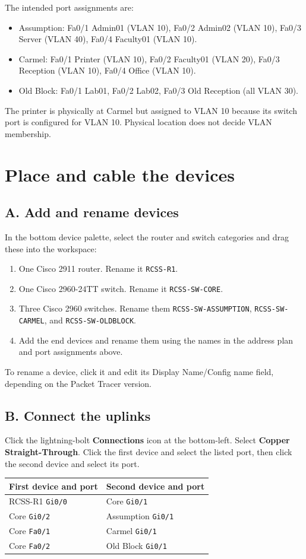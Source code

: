 \documentclass[11pt,a4paper]{article}
\begin{document}
The intended port assignments are:
\begin{itemize}
\item Assumption: Fa0/1 Admin01 (VLAN 10), Fa0/2 Admin02 (VLAN 10), Fa0/3 Server (VLAN 40), Fa0/4 Faculty01 (VLAN 10).
\item Carmel: Fa0/1 Printer (VLAN 10), Fa0/2 Faculty01 (VLAN 20), Fa0/3 Reception (VLAN 10), Fa0/4 Office (VLAN 10).
\item Old Block: Fa0/1 Lab01, Fa0/2 Lab02, Fa0/3 Old Reception (all VLAN 30).
\end{itemize}
The printer is physically at Carmel but assigned to VLAN 10 because its switch port is configured for VLAN 10. Physical location does not decide VLAN membership.

\section{Place and cable the devices}\label{sec:topology}
\subsection*{A. Add and rename devices}
In the bottom device palette, select the router and switch categories and drag these into the workspace:
\begin{enumerate}
\item One Cisco 2911 router. Rename it \texttt{RCSS-R1}.
\item One Cisco 2960-24TT switch. Rename it \texttt{RCSS-SW-CORE}.
\item Three Cisco 2960 switches. Rename them \texttt{RCSS-SW-ASSUMPTION}, \texttt{RCSS-SW-CARMEL}, and \texttt{RCSS-SW-OLDBLOCK}.
\item Add the end devices and rename them using the names in the address plan and port assignments above.
\end{enumerate}
To rename a device, click it and edit its Display Name/Config name field, depending on the Packet Tracer version.

\subsection*{B. Connect the uplinks}
Click the lightning-bolt \textbf{Connections} icon at the bottom-left. Select \textbf{Copper Straight-Through}. Click the first device and select the listed port, then click the second device and select its port.

\begin{center}
\begin{tabular}{@{}ll@{}}
\toprule
First device and port & Second device and port\\
\midrule
RCSS-R1 \texttt{Gi0/0} & Core \texttt{Gi0/1}\\
Core \texttt{Gi0/2} & Assumption \texttt{Gi0/1}\\
Core \texttt{Fa0/1} & Carmel \texttt{Gi0/1}\\
Core \texttt{Fa0/2} & Old Block \texttt{Gi0/1}\\
\bottomrule
\end{tabular}
\end{center}
\end{document}
